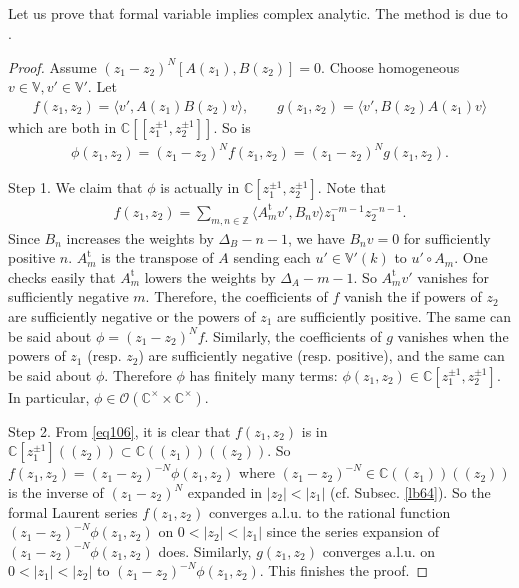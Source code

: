 \documentclass[11pt,b5paper,notitlepage]{article}
\theoremstyle{definition}
\theoremstyle{plain}
\newcommand{\tr}{\mathrm{t}} %
\newcommand{\bk}[1]{\langle {#1}\rangle}
\newcommand{\scr}{\mathscr}
\newcommand{\Vbb}{\mathbb V}
\newcommand{\Cbb}{\mathbb C}
\newcommand{\Zbb}{\mathbb Z}
\numberwithin{equation}{section}
\begin{document}
\subsection{}\label{lb68}

Let us prove that formal variable implies complex analytic. The method is due to \cite{FHL93}.
\begin{proof}
Assume $(z_1-z_2)^N[A(z_1),B(z_2)]=0$. Choose homogeneous $v\in\Vbb,v'\in\Vbb'$. Let
\begin{align*}
	f(z_1,z_2)=	\bk{v',A(z_1)B(z_2)v},\qquad g(z_1,z_2)=\bk{v',B(z_2)A(z_1)v}
\end{align*}
which are both in $\Cbb[[z_1^{\pm1},z_2^{\pm1}]]$. So is
\begin{align*}
	\phi(z_1,z_2)=(z_1-z_2)^Nf(z_1,z_2)=(z_1-z_2)^Ng(z_1,z_2).	
\end{align*}


Step 1. We claim that $\phi$ is actually in $\Cbb[z_1^{\pm1},z_2^{\pm1}]$. Note that
\begin{align}
f(z_1,z_2)=\sum_{m,n\in\Zbb}\bk{A^\tr_mv',B_nv}z_1^{-m-1}z_2^{-n-1}.\label{eq106}
\end{align}
Since $B_n$ increases the weights by $\Delta_B-n-1$, we have $B_nv=0$ for sufficiently positive $n$. $A_m^\tr$ is the transpose of $A$ sending each $u'\in\Vbb'(k)$ to $u'\circ A_m$. One checks easily that $A_m^\tr$ lowers the weights by $\Delta_A-m-1$. So $A_m^\tr v'$ vanishes for sufficiently negative $m$. Therefore, the coefficients of $f$ vanish the if powers of $z_2$ are sufficiently negative or the powers of $z_1$ are sufficiently positive. The same can be said about $\phi=(z_1-z_2)^Nf$. Similarly, the coefficients of $g$ vanishes when the powers of $z_1$ (resp. $z_2$) are sufficiently negative (resp. positive), and the same can be said about $\phi$. Therefore $\phi$ has finitely many terms: $\phi(z_1,z_2)\in\Cbb[z_1^{\pm1},z_2^{\pm1}]$. In particular, $\phi\in\scr O(\Cbb^\times\times\Cbb^\times)$.

Step 2. From \eqref{eq106}, it is clear that $f(z_1,z_2)$ is in $\Cbb[z_1^{\pm1}]((z_2))\subset\Cbb((z_1))((z_2))$. So $f(z_1,z_2)=(z_1-z_2)^{-N}\phi(z_1,z_2)$ where $(z_1-z_2)^{-N}\in\Cbb((z_1))((z_2))$ is the inverse of $(z_1-z_2)^N$ expanded in $|z_2|<|z_1|$ (cf. Subsec. \ref{lb64}). So the formal Laurent series $f(z_1,z_2)$ converges a.l.u. to the rational function $(z_1-z_2)^{-N}\phi(z_1,z_2)$ on $0<|z_2|<|z_1|$ since the series expansion of $(z_1-z_2)^{-N}\phi(z_1,z_2)$ does. Similarly, $g(z_1,z_2)$ converges a.l.u. on $0<|z_1|<|z_2|$ to $(z_1-z_2)^{-N}\phi(z_1,z_2)$. This finishes the proof.
\end{proof}
\end{document}
